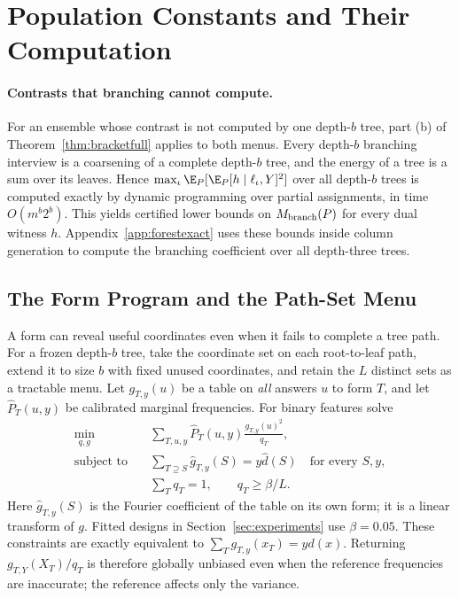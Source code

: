 \section{Population Constants and Their Computation}\label{app:E}



\paragraph{Contrasts that branching cannot compute.}
For an ensemble whose contrast is not computed by one depth-$b$ tree, part (b)
of Theorem~\ref{thm:bracketfull} applies to both menus. Every depth-$b$ branching interview is a coarsening of
a complete depth-$b$ tree, and the energy of a tree is a sum over its leaves.
Hence $\max_\iota\E_P[\E_P[h\mid\ell_\iota,Y]^2]$ over all depth-$b$ trees is
computed exactly by dynamic programming over partial assignments, in time
$O(m^b2^b)$. This yields certified lower bounds on $M_{\rm branch}(P)$ for every
dual witness $h$. Appendix~\ref{app:forestexact} uses these bounds inside
column generation to compute the branching coefficient over all depth-three
trees.



\subsection{The Form Program and the Path-Set Menu}\label{sec:pathdesign}
A form can reveal useful coordinates even when it fails to complete a tree path. For a frozen depth-$b$ tree, take the coordinate set on each root-to-leaf path, extend it to size $b$ with fixed unused coordinates, and retain the $L$ distinct sets as a tractable menu. Let $g_{T,y}(u)$ be a table on \emph{all} answers $u$ to form $T$, and let $\widehat P_T(u,y)$ be calibrated marginal frequencies. For binary features solve
\begin{align}
 \min_{q,g}\quad&\sum_{T,u,y}\widehat P_T(u,y)
                       \frac{g_{T,y}(u)^2}{q_T},\label{eq:fullprogram}\\
 \text{subject to}\quad&\sum_{T\supseteq S}\widehat g_{T,y}(S)
                   =y\widehat d(S)\quad\text{for every }S,y,\nonumber\\
 &\sum_Tq_T=1,\qquad q_T\ge\beta/L.\nonumber
\end{align}
Here $\widehat g_{T,y}(S)$ is the Fourier coefficient of the table on its own form; it is a linear transform of $g$. Fitted designs in Section~\ref{sec:experiments} use $\beta=0.05$. These constraints are exactly equivalent to $\sum_Tg_{T,y}(x_T)=yd(x)$. Returning $g_{T,Y}(X_T)/q_T$ is therefore globally unbiased even when the reference frequencies are inaccurate; the reference affects only the variance.

